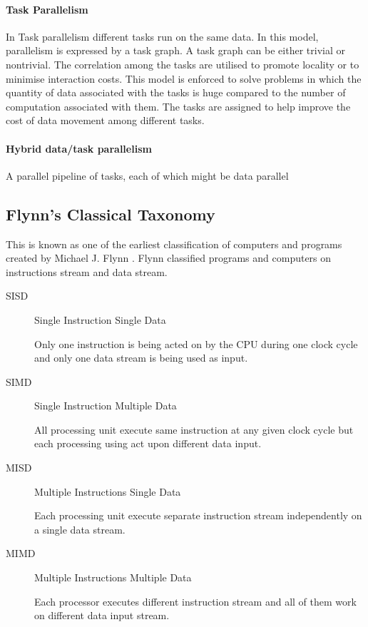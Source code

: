 \paragraph{Task Parallelism}
In Task parallelism different tasks run on the same data. In this model, parallelism is expressed by a task graph. A task graph can be either trivial or nontrivial. The correlation among the tasks are utilised to promote locality or to minimise interaction costs. This model is enforced to solve problems in which the quantity of data associated with the tasks is huge compared to the number of computation associated with them. The tasks are assigned to help improve the cost of data movement among different tasks.

\paragraph{Hybrid data/task parallelism}
A parallel pipeline of tasks, each of which might be data parallel

\subsection{Flynn's Classical Taxonomy}
This is known as one of the earliest classification of computers and programs created by Michael J. Flynn \citep{Barney:16}. Flynn classified programs and computers on instructions stream and data stream.

\begin{description}
\item [SISD] {Single Instruction Single Data}

Only one instruction is being acted on by the CPU during one clock cycle and only one data stream is being used as input.

\item [SIMD] Single Instruction Multiple Data

All processing unit execute same instruction at any given clock cycle but each processing using act upon different data input.

\item [MISD] Multiple Instructions Single Data

Each processing unit execute separate instruction stream independently on a single data stream.

\item [MIMD] Multiple Instructions Multiple Data

Each processor executes different instruction stream and all of them work on different data input stream.
\end{description}

